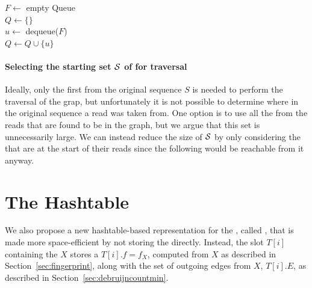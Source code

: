 \begin{algorithm}
	\caption{$C.\mathit{traverse}(\strsetname{S}, t)$}\label{alg:traversal}
  $F \gets$ empty Queue\\
  $Q \gets \{\}$\\
   {
    $u \gets$ dequeue($F$)\\
    $Q \gets Q \cup \{u\}$\\
  }
\end{algorithm}

\paragraph*{Selecting the starting set $\strsetname{S}$ of  for traversal} Ideally, only the first \kmer from the original sequence $S$ is needed to perform the traversal of the grap, but unfortunately it is not possible to determine where in the original sequence a read was taken from. One option is to use all the  from the reads that are found to be in the graph, but we argue that this set is unnecessarily large. We can instead reduce the size of $\strsetname{S}$ by only considering the  that are at the start of their reads since the following \kmers would be reachable from it anyway.

\section{The \dB Hashtable}
\label{sec:debruijnhashtable}

We also propose a new hashtable-based representation for the \dBG, called  \dBHT, that is made more space-efficient by not storing the \kmer directly. Instead, the slot $T[i]$ containing the \kmer $X$ stores a  $T[i].f = f_X$, computed from $X$ as described in Section~\ref{sec:fingerprint}, along with the set of outgoing edges from $X$, $T[i].E$,  as described in Section~\ref{sec:debruijncountmin}.

